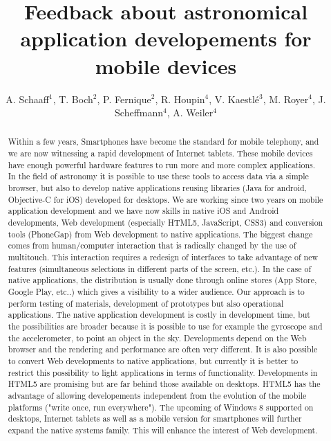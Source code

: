 \documentclass[11pt,twoside]{article}
\begin{document}
\title{Feedback about astronomical application developements for mobile devices}
\author{A. Schaaff$^1$, T. Boch$^2$, P. Fernique$^2$, R. Houpin$^4$, V. Kaestl\'e$^3$, M. Royer$^4$, J. Scheffmann$^4$, A. Weiler$^4$
}

\begin{abstract}
Within a few years, Smartphones have become the standard for mobile telephony, and we are now witnessing a rapid development of Internet tablets. These mobile devices have enough powerful hardware features to run more and more complex applications. In the field of astronomy it is possible to use these tools to access data via a simple browser, but also to develop native applications reusing libraries (Java for android, Objective-C for iOS) developed for desktops. We are working since two years on mobile application development and we have now skills in native iOS and Android developments, Web development (especially HTML5, JavaScript, CSS3) and conversion tools (PhoneGap) from Web development to native applications. The biggest change comes from human/computer interaction that is radically changed by the use of multitouch. This interaction requires a redesign of interfaces to take advantage of new features (simultaneous selections in different parts of the screen, etc.). In the case of native applications, the distribution is usually done through online stores (App Store, Google Play, etc..) which gives a visibility to a wider audience. Our approach is to perform testing of materials, development of prototypes but also operational applications. The native application development is costly in development time, but the possibilities are broader because it is possible to use for example the gyroscope and the accelerometer, to point an object in the sky. Developments depend on the Web browser and the rendering and performance are often very different. It is also possible to convert Web developments to native applications, but currently it is better to restrict this possibility to light applications in terms of functionality. Developments in HTML5 are promising but are far behind those available on desktops. HTML5 has the advantage of allowing developements independent from the evolution of the mobile platforms ("write once, run everywhere"). The upcoming of Windows 8 supported on desktops, Internet tablets as well as a mobile version for smartphones will further expand the native systems family. This will enhance the interest of Web development.
\end{abstract}
\end{document}
